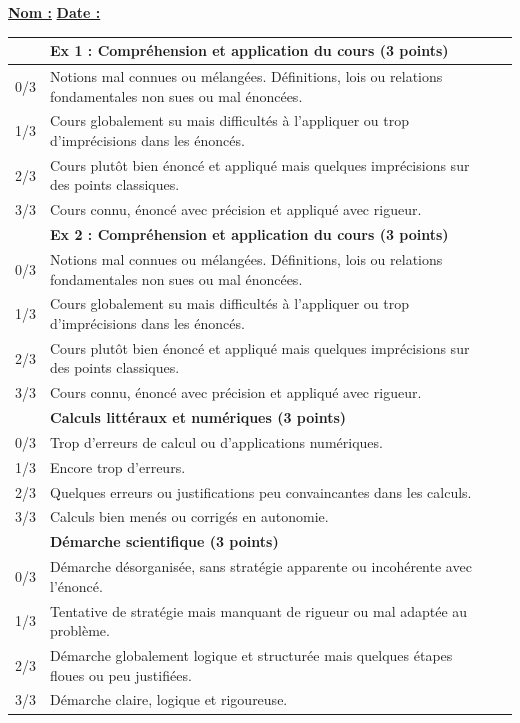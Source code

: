 \documentclass[a4paper,12pt,french]{article}
\newcommand{\e}[1]{\vspace{5mm}\noindent \textbf{\underline{#1}}}
\begin{document}
\begin{scriptsize}
	
\e{Nom :} \hfill \e{Date :} \hspace{3cm}

\begin{center}
\begin{tabular}{|p{}|p{}|p{}|}
	\hline
	& \textbf{Ex 1 : Compréhension et application du cours (3 points)} & \\ \hline
	0/3 & Notions mal connues ou mélangées. Définitions, lois ou relations fondamentales non sues ou mal énoncées. & \\ \hline
	1/3 & Cours globalement su mais difficultés à l'appliquer ou trop d'imprécisions dans les énoncés. & \\ \hline
	2/3 & Cours plutôt bien énoncé et appliqué mais quelques imprécisions sur des points classiques. & \\ \hline
	3/3 & Cours connu, énoncé avec précision et appliqué avec rigueur. & \\ \hline
	& \textbf{Ex 2 : Compréhension et application du cours (3 points)} & \\ \hline
	0/3 & Notions mal connues ou mélangées. Définitions, lois ou relations fondamentales non sues ou mal énoncées. & \\ \hline
	1/3 & Cours globalement su mais difficultés à l'appliquer ou trop d'imprécisions dans les énoncés. & \\ \hline
	2/3 & Cours plutôt bien énoncé et appliqué mais quelques imprécisions sur des points classiques. & \\ \hline
	3/3 & Cours connu, énoncé avec précision et appliqué avec rigueur. & \\ \hline
	
	& \textbf{Calculs littéraux et numériques (3 points)} & \\ \hline
	0/3 & Trop d'erreurs de calcul ou d'applications numériques. & \\ \hline
	1/3 & Encore trop d'erreurs. & \\ \hline
	2/3 & Quelques erreurs ou justifications peu convaincantes dans les calculs. & \\ \hline
	3/3 & Calculs bien menés ou corrigés en autonomie. & \\ \hline
	
	& \textbf{Démarche scientifique (3 points)} & \\ \hline
	0/3 & Démarche désorganisée, sans stratégie apparente ou incohérente avec l'énoncé. & \\ \hline
	1/3 & Tentative de stratégie mais manquant de rigueur ou mal adaptée au problème. & \\ \hline
	2/3 & Démarche globalement logique et structurée mais quelques étapes floues ou peu justifiées. & \\ \hline
	3/3 & Démarche claire, logique et rigoureuse. & \\ \hline
	

\end{tabular}
\end{center}
\end{scriptsize}
\end{document}
